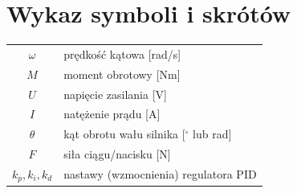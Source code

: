 \documentclass[11pt, a4paper, twoside]{report}
\begin{document}
\clearpage\thispagestyle{empty}\mbox{}\clearpage

\tableofcontents

\clearpage\thispagestyle{empty}\mbox{}\clearpage

\makeatletter
\let\ps@plain\origpsplain
\makeatother
\pagestyle{fancy} 







\newpage


\printbibliography[title={Literatura}]

\clearpage\thispagestyle{empty}\mbox{}\clearpage


\chapter*{Wykaz symboli i skrótów}

\begin{tabular}{cl} %
	$\omega$ & prędkość kątowa [rad/s] \\
	$M$      & moment obrotowy [Nm] \\
	$U$      & napięcie zasilania [V] \\
	$I$      & natężenie prądu [A] \\
	$\theta$ & kąt obrotu wału silnika [$^\circ$ lub rad] \\
	$F$      & siła ciągu/nacisku [N] \\
	$k_p, k_i, k_d$ & nastawy (wzmocnienia) regulatora PID \\
\end{tabular}
\end{document}
